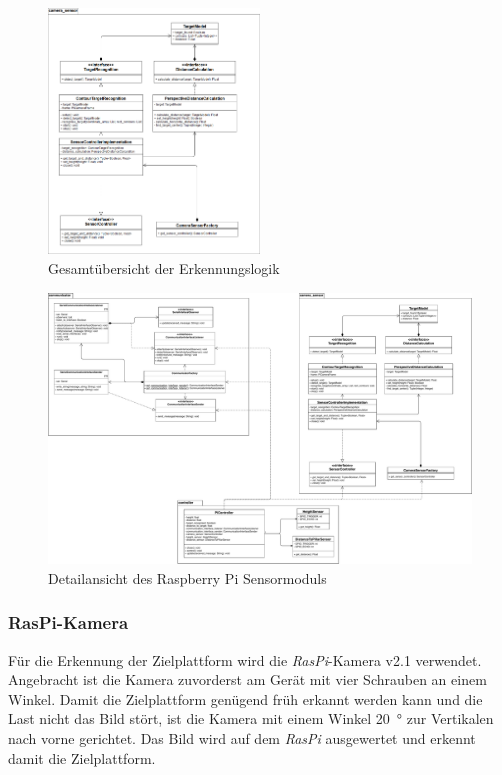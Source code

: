 \documentclass[a4paper]{report}
\begin{document}
\begin{figure}[h!]
	\centering
	\includegraphics[keepaspectratio,width=0.5\textwidth]{pi-sensor_cs}
	\caption{Gesamtübersicht der Erkennungslogik}
	\label{fig:KameraSensor}
\end{figure}

\begin{landscape}

	\begin{figure}[h!]
		\centering
		\includegraphics[keepaspectratio,width=\linewidth]{pi-sensor}
		\caption{Detailansicht des Raspberry Pi Sensormoduls}
		\label{fig:PiSensor}
	\end{figure}

\end{landscape}

\subsubsection{RasPi-Kamera}
Für die Erkennung der Zielplattform wird die \textit{RasPi}-Kamera v2.1 verwendet. Angebracht ist die Kamera zuvorderst am Gerät mit vier Schrauben an einem Winkel. Damit die Zielplattform genügend früh erkannt werden kann und die Last nicht das Bild stört, ist die Kamera mit einem Winkel \SI{20}{\degree} zur Vertikalen nach vorne gerichtet. Das Bild wird auf dem \textit{RasPi} ausgewertet und erkennt damit die Zielplattform.
\end{document}
